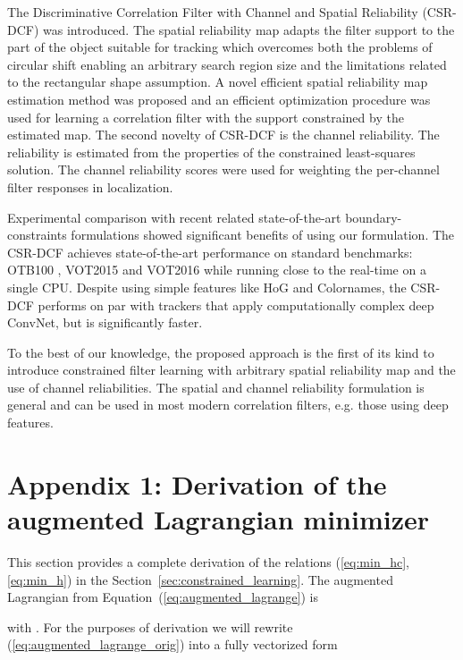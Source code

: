 \documentclass[twocolumn]{article}
\begin{document}
The Discriminative Correlation Filter with Channel and Spatial Reliability (CSR-DCF) was introduced. The spatial reliability map adapts the filter support to the part of the object suitable for tracking which overcomes both the problems of circular shift enabling an arbitrary search region size and the limitations related to the rectangular shape assumption. A novel efficient spatial reliability map estimation 
method was proposed and an efficient optimization procedure was used for learning a correlation filter with the support constrained by the estimated map. The second novelty of CSR-DCF is the channel reliability. The reliability is estimated from the properties of the constrained least-squares solution. The channel reliability scores were used for weighting the per-channel filter responses in localization.

Experimental comparison with recent related state-of-the-art  boundary-constraints formulations showed significant benefits of using our formulation. The CSR-DCF achieves state-of-the-art performance on standard benchmarks: OTB100 \citep{otb_pami2015}, VOT2015 \citep{kristan_vot2015} and VOT2016 \citep{kristan_vot2016} while running close to the real-time on a single CPU. Despite using simple features like HoG and Colornames, the CSR-DCF performs on par with trackers that apply computationally complex deep ConvNet, but is significantly faster. 
 
To the best of our knowledge, the proposed approach is the first of its kind to introduce constrained filter learning with arbitrary spatial reliability map and the use of channel reliabilities. The spatial and channel reliability formulation is general and can be used in most modern correlation filters, e.g. those using deep features. 



\section{Appendix 1: Derivation of the augmented Lagrangian minimizer}  \label{sec:lagrangian_derivation}

This section provides a complete derivation of the relations (\ref{eq:min_hc}, \ref{eq:min_h}) in the Section~\ref{sec:constrained_learning}. The augmented Lagrangian from Equation~(\ref{eq:augmented_lagrange}) is

with . For the purposes of derivation we will rewrite (\ref{eq:augmented_lagrange_orig}) into a fully vectorized form
\end{document}
